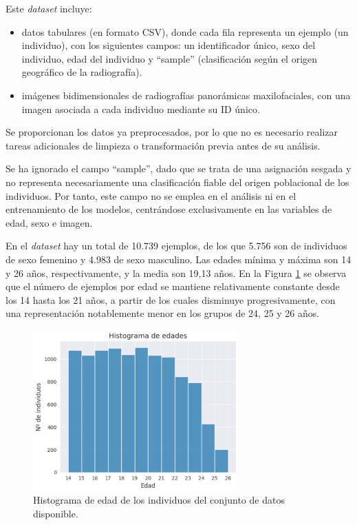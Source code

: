 Este \textit{dataset} incluye:

\begin{itemize}

    \item datos tabulares (en formato CSV), donde cada fila representa un ejemplo (un individuo), con los 
    siguientes campos: un identificador único, sexo del individuo, edad del individuo y ``sample'' 
    (clasificación según el origen geográfico de la radiografía).

    \item imágenes bidimensionales de radiografías panorámicas maxilofaciales, con una imagen asociada 
    a cada individuo mediante su ID único. 

\end{itemize}

Se proporcionan los datos ya preprocesados, por lo que no es necesario realizar tareas adicionales de limpieza 
o transformación previa antes de su análisis.

Se ha ignorado el campo ``sample'', dado que se trata de una asignación sesgada y no representa 
necesariamente una clasificación fiable del origen poblacional de los individuos. Por tanto, este campo no 
se emplea en el análisis ni en el entrenamiento de los modelos, centrándose exclusivamente en las variables 
de edad, sexo e imagen.

En el \textit{dataset} hay un total de 10.739 ejemplos, de los que 5.756 son de individuos de sexo femenino 
y 4.983 de sexo masculino. 
Las edades mínima y máxima son 14 y 26 años, respectivamente, y la media son 19,13 años.
En la Figura \ref{fig:histogram_ages} se observa que el número de ejemplos por edad se mantiene relativamente 
constante desde los 14 hasta los 21 años, a partir de los cuales disminuye progresivamente, con una 
representación notablemente menor en los grupos de 24, 25 y 26 años.
 
\begin{figure}[h]
    \centering
    \includegraphics[width=0.7\textwidth]{capitulos/cap_04/imagenes/histogram_ages.png}
    \caption[
        Histograma de edad de los individuos del conjunto de datos disponible.
    ]{
        Histograma de edad de los individuos del conjunto de datos disponible. 
    } 
    \label{fig:histogram_ages}
\end{figure}

